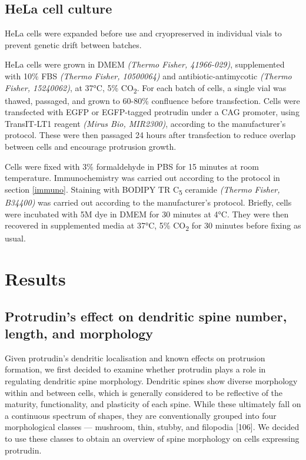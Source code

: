 \documentclass[
  12pt,
  a4paper,
]{book}
\begin{document}
\hypertarget{hela-cell-culture}{%
\subsection{HeLa cell culture}\label{hela-cell-culture}}

HeLa cells were expanded before use and cryopreserved in individual vials to prevent genetic drift between batches.

HeLa cells were grown in DMEM \emph{(Thermo Fisher, 41966-029)}, supplemented with 10\% FBS \emph{(Thermo Fisher, 10500064)} and antibiotic-antimycotic \emph{(Thermo Fisher, 15240062)}, at 37°C, 5\% CO\textsubscript{2}. For each batch of cells, a single vial was thawed, passaged, and grown to 60-80\% confluence before transfection. Cells were transfected with EGFP or EGFP-tagged protrudin under a CAG promoter, using TransIT-LT1 reagent \emph{(Mirus Bio, MIR2300)}, according to the manufacturer's protocol. These were then passaged 24 hours after transfection to reduce overlap between cells and encourage protrusion growth.

Cells were fixed with 3\% formaldehyde in PBS for 15 minutes at room temperature. Immunochemistry was carried out according to the protocol in section \ref{immuno}. Staining with BODIPY TR C\textsubscript{5} ceramide \emph{(Thermo Fisher, B34400)} was carried out according to the manufacturer's protocol. Briefly, cells were incubated with 5\textmu{}M dye in DMEM for 30 minutes at 4°C. They were then recovered in supplemented media at 37°C, 5\% CO\textsubscript{2} for 30 minutes before fixing as usual.

\hypertarget{results-1}{%
\section{Results}\label{results-1}}

\hypertarget{protrudins-effect-on-dendritic-spine-number-length-and-morphology}{%
\subsection{Protrudin's effect on dendritic spine number, length, and morphology}\label{protrudins-effect-on-dendritic-spine-number-length-and-morphology}}

Given protrudin's dendritic localisation and known effects on protrusion formation, we first decided to examine whether protrudin plays a role in regulating dendritic spine morphology. Dendritic spines show diverse morphology within and between cells, which is generally considered to be reflective of the maturity, functionality, and plasticity of each spine. While these ultimately fall on a continuous spectrum of shapes, they are conventionally grouped into four morphological classes --- mushroom, thin, stubby, and filopodia {[}106{]}. We decided to use these classes to obtain an overview of spine morphology on cells expressing protrudin.
\end{document}
